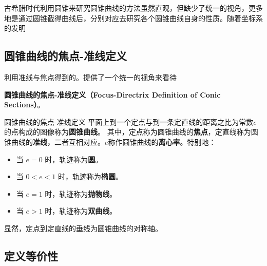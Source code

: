

古希腊时代利用圆锥来研究圆锥曲线的方法虽然直观，但缺少了统一的视角，更多地是通过圆锥截得曲线后，分别对应去研究各个圆锥曲线自身的性质。随着坐标系的发明

\subsection{圆锥曲线的焦点-准线定义}

利用准线与焦点得到的。提供了一个统一的视角来看待

\textbf{圆锥曲线的焦点-准线定义（Focus-Directrix Definition of Conic Sections）}。

\begin{definition}{圆锥曲线的焦点-准线定义}
平面上到一个定点与到一条定直线的距离之比为常数$e$的点构成的图像称为\textbf{圆锥曲线}。
其中，定点称为圆锥曲线的\textbf{焦点}，定直线称为圆锥曲线的\textbf{准线}，二者互相对应。$e$称作圆锥曲线的\textbf{离心率}。特别地：
\begin{itemize}
\item 当 $e =0$ 时，轨迹称为\textbf{圆}。
\item 当 $0 < e < 1$ 时，轨迹称为\textbf{椭圆}。
\item 当 $e =1$ 时，轨迹称为\textbf{抛物线}。
\item 当 $e > 1$ 时，轨迹称为\textbf{双曲线}。
\end{itemize}
\end{definition}

显然，定点到定直线的垂线为圆锥曲线的对称轴。

\subsection{定义等价性}